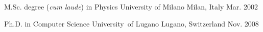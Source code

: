 

\begin{cventries}





\cventry
{M.Sc. degree (\emph{cum laude}) in Physics}
{University of Milano}
{Milan, Italy}
{Mar. 2002}
{}

\cventry
{Ph.D. in Computer Science}
{University\ of Lugano}
{Lugano, Switzerland}
{Nov. 2008}
{}
\end{cventries}
